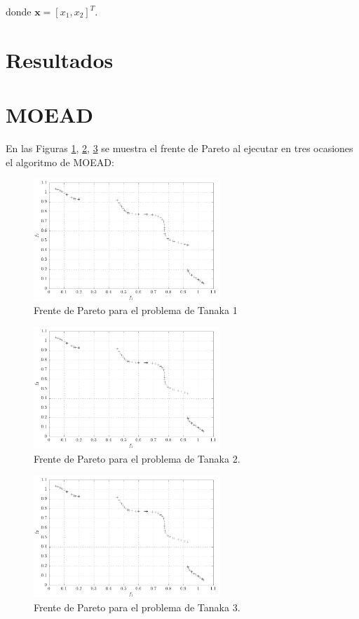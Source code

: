 \documentclass[conference]{IEEEtran}
\begin{document}
donde $\mathbf{x} = \left[ x_{1}, x_{2} \right]^{T}$.

\section{Resultados}

\section{MOEAD}

En las Figuras \ref{fig:tanaka1}, \ref{fig:tanaka2}, \ref{fig:tanaka3} se muestra el frente de Pareto al ejecutar en tres ocasiones el algoritmo de MOEAD:
\begin{figure}[hbtp]
\centering
\includegraphics[width=7cm]{MOE1.pdf}
\caption{Frente de Pareto para el problema de Tanaka 1}
\label{fig:tanaka1}
\end{figure}

\begin{figure}[hbtp]
\centering
\includegraphics[width=7cm]{MOE2.pdf}
\caption{Frente de Pareto para el problema de Tanaka  2.}
\label{fig:tanaka2}
\end{figure}

\begin{figure}[hbtp]
\centering
\includegraphics[width=7cm]{MOE3.pdf}
\caption{Frente de Pareto para el problema de Tanaka 3.}
\label{fig:tanaka3}
\end{figure}
\end{document}
